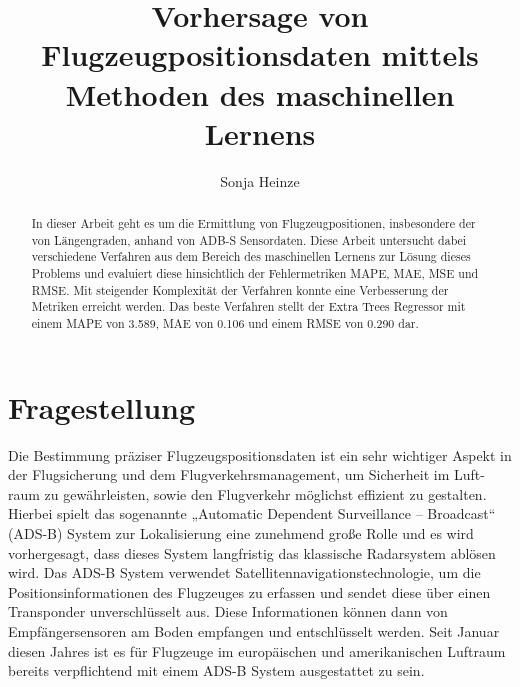 \documentclass{svproc}
\begin{document}
\mainmatter              %
%
\title{Vorhersage von Flugzeugpositionsdaten mittels Methoden des maschinellen Lernens}
%
%
\author{Sonja Heinze }
%
%
%
%
\maketitle              %
%
\begin{abstract}
    In dieser Arbeit geht es um die Ermittlung von Flugzeugpositionen, insbesondere der von Längengraden, anhand von ADB-S Sensordaten. Diese Arbeit untersucht dabei verschiedene Verfahren aus dem Bereich des maschinellen Lernens zur Lösung dieses Problems und evaluiert diese hinsichtlich der Fehlermetriken MAPE, MAE, MSE und RMSE.
    Mit steigender Komplexität der Verfahren konnte eine Verbesserung der Metriken erreicht werden. Das beste Verfahren stellt der Extra Trees Regressor mit einem MAPE von 3.589, MAE von 0.106 und einem RMSE von 0.290 dar.
\end{abstract}
%
%
\section{Fragestellung}
%
Die Bestimmung präziser Flugzeugspositionsdaten ist ein sehr wichtiger Aspekt in der Flugsicherung und dem Flugverkehrsmanagement, um Sicherheit im Luft- raum zu gewährleisten, sowie den Flugverkehr möglichst effizient zu gestalten. \cite{Adesina2019,Daestner2019}
Hierbei spielt das sogenannte „Automatic Dependent Surveillance – Broadcast“ (ADS-B) System zur Lokalisierung eine zunehmend große Rolle und es wird vorhergesagt, dass dieses System langfristig das klassische Radarsystem ablösen wird.\cite{meijer2016} Das ADS-B System verwendet Satellitennavigationstechnologie, um die Positionsinformationen des Flugzeuges zu erfassen und sendet diese über einen Transponder unverschlüsselt aus. Diese Informationen können dann von Empfängersensoren am Boden empfangen und entschlüsselt werden.\cite{Sun2016} Seit Januar diesen Jahres ist es für Flugzeuge im europäischen und amerikanischen Luftraum bereits verpflichtend mit einem ADS-B System ausgestattet zu sein. \cite{Adesina2019}
\end{document}
